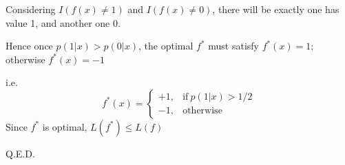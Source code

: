 \documentclass[12pt,oneside,a4paper]{article}
\begin{document}
Considering $I(f(x) \neq 1)$ and $I(f(x) \neq 0)$, there will be exactly one has value 1, and another one 0.

Hence once $p(1|x) > p(0|x)$, the optimal $f^*$ must satisfy $f^*(x) = 1$; otherwise $f^*(x) = -1$

i.e.
\begin{equation*}
f^*(x) = \left\{ \begin{array}{ll}
+1, & \mathrm{if} ~ p(1|x) > 1/2\\
-1, & \mathrm{otherwise}
\end{array}
\right.
\end{equation*}
Since $f^*$ is optimal, $L(f^*) \leq L(f)$

Q.E.D.
\end{document}
